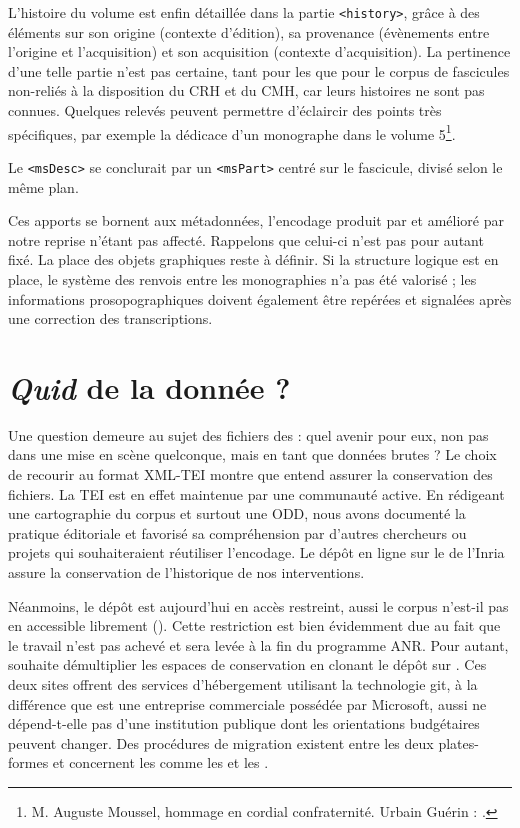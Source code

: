 L'histoire du volume est enfin détaillée dans la partie \texttt{<history>}, grâce à des éléments sur son origine (contexte d'édition), sa provenance (évènements entre l'origine et l'acquisition) et son acquisition (contexte d'acquisition). La pertinence d'une telle partie n'est pas certaine, tant pour les \odm{} que pour le corpus de fascicules non-reliés à la disposition du CRH et du CMH, car leurs histoires ne sont pas connues. Quelques relevés peuvent permettre d'éclaircir des points très spécifiques, par exemple la dédicace d'un monographe dans le volume 5\footnote{\og M. Auguste Moussel, hommage en cordial confraternité. Urbain Guérin \fg{} : \cite{mono083a}.}.

Le \texttt{<msDesc>} se conclurait par un \texttt{<msPart>} centré sur le fascicule, divisé selon le même plan.

Ces apports se bornent aux métadonnées, l'encodage produit par \lse{} et amélioré par notre reprise n'étant pas affecté. Rappelons que celui-ci n'est pas pour autant fixé. La place des objets graphiques reste à définir. Si la structure logique est en place, le système des renvois entre les monographies n'a pas été valorisé ; les informations prosopographiques doivent également être repérées et signalées après une correction des transcriptions.

\section{\textit{Quid} de la donnée ?}

Une question demeure au sujet des fichiers des \odm{} : quel avenir pour eux, non pas dans une mise en scène quelconque, mais en tant que données brutes ? Le choix de recourir au format XML-TEI montre que \timeus{} entend assurer la conservation des fichiers. La TEI est en effet maintenue par une communauté active. En rédigeant une cartographie du corpus et surtout une ODD, nous avons documenté la pratique éditoriale et favorisé sa compréhension par d'autres chercheurs ou projets qui souhaiteraient réutiliser l'encodage. Le dépôt en ligne sur le \gitlab{} de l'Inria assure la conservation de l'historique de nos interventions.

Néanmoins, le dépôt \gitlab{} est aujourd'hui en accès restreint, aussi le corpus n'est-il pas en accessible librement (\openaccess). Cette restriction est bien évidemment due au fait que le travail n'est pas achevé et sera levée à la fin du programme ANR. Pour autant, \timeus{} souhaite démultiplier les espaces de conservation en clonant le dépôt \gitlab{} sur \github. Ces deux sites offrent des services d'hébergement utilisant la technologie git, à la différence que \github{} est une entreprise commerciale possédée par Microsoft, aussi ne dépend-t-elle pas d'une institution publique dont les orientations budgétaires peuvent changer. Des procédures de migration existent entre les deux plates-formes et concernent les \commits{} comme les \issues{} et les \mergerequests.


